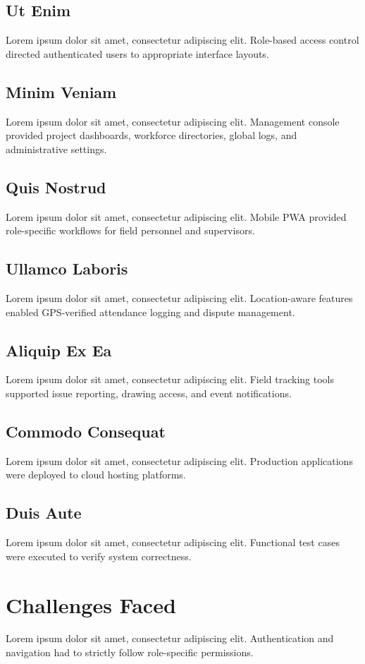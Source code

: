 \documentclass[12pt,a4paper,oneside]{report}
\begin{document}
\section{Ut Enim}
Lorem ipsum dolor sit amet, consectetur adipiscing elit. Role-based access control directed authenticated users to appropriate interface layouts.

\section{Minim Veniam}
Lorem ipsum dolor sit amet, consectetur adipiscing elit. Management console provided project dashboards, workforce directories, global logs, and administrative settings.

\section{Quis Nostrud}
Lorem ipsum dolor sit amet, consectetur adipiscing elit. Mobile PWA provided role-specific workflows for field personnel and supervisors.

\section{Ullamco Laboris}
Lorem ipsum dolor sit amet, consectetur adipiscing elit. Location-aware features enabled GPS-verified attendance logging and dispute management.

\section{Aliquip Ex Ea}
Lorem ipsum dolor sit amet, consectetur adipiscing elit. Field tracking tools supported issue reporting, drawing access, and event notifications.

\section{Commodo Consequat}
Lorem ipsum dolor sit amet, consectetur adipiscing elit. Production applications were deployed to cloud hosting platforms.

\section{Duis Aute}
Lorem ipsum dolor sit amet, consectetur adipiscing elit. Functional test cases were executed to verify system correctness.

\chapter{Challenges Faced}
Lorem ipsum dolor sit amet, consectetur adipiscing elit. Authentication and navigation had to strictly follow role-specific permissions.
\end{document}
